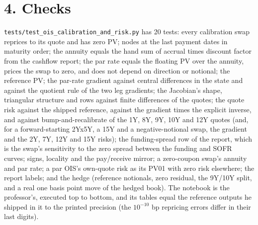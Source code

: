 \documentclass[10pt]{article}
\newcommand{\code}[1]{\texttt{#1}}
\begin{document}
\section*{4. Checks}
\code{tests/test\_ois\_calibration\_and\_risk.py} has 20 tests: every calibration swap reprices to its quote and has zero PV;
nodes at the last payment dates in maturity order; the annuity equals the hand sum of accrual times discount factor from the cashflow
report; the par rate equals the floating PV over the annuity, prices the swap to zero, and does not depend on direction or notional;
the reference PV; the par-rate gradient against central differences in the state and against the quotient rule of the two leg
gradients; the Jacobian's shape, triangular structure and rows against finite differences of the quotes; the quote risk against the
shipped reference, against the gradient times the explicit inverse, and against bump-and-recalibrate of the 1Y, 8Y, 9Y, 10Y and 12Y
quotes (and, for a forward-starting 2Yx5Y, a 15Y and a negative-notional swap, the gradient and the 2Y, 7Y, 12Y and 15Y risks); the
funding-spread row of the report, which is the swap's sensitivity to the zero spread between the funding and SOFR curves; signs,
locality and the pay/receive mirror; a zero-coupon swap's annuity and par rate; a par OIS's own-quote risk as its PV01 with zero risk elsewhere; the report labels;
and the hedge (reference notionals, zero residual, the 9Y/10Y split, and a real one basis point move of the hedged book). The notebook
is the professor's, executed top to bottom, and its tables equal the reference outputs he shipped in it to the printed precision
(the $10^{-10}$ bp repricing errors differ in their last digits).
\end{document}
